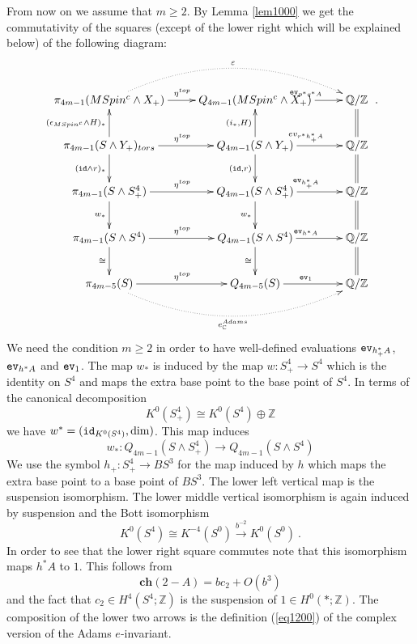 \documentclass[12pt]{article}
\newcommand{\ev}{{\tt ev}}
\newcommand{\id}{{\tt id}}
\newcommand{\Z}{{\mathbb{Z}}}
\newcommand{\Q}{{\mathbb{Q}}}
\newcommand{\C}{{\mathbb{C}}}
\newcommand{\ch}{{\mathbf{ch}}}
\begin{document}
From now on we assume that $m\ge 2$.
By Lemma \ref{lem1000}  we get the commutativity of the  squares (except of the lower right which will be explained below) of  the following  diagram:
\begin{equation}\label{cg100}
\xymatrix{\pi_{4m-1}(MSpin^{c}\wedge X_{+})\ar@/^1cm/@{.>}[rr]^{\varepsilon}\ar[r]^{\eta^{top}}&Q_{4m-1}(MSpin^{c}\wedge  X_{+})\ar[r]^{\ev_{p^{*}q^{*}A}}&\Q/\Z\\
\pi_{4m-1}(S\wedge Y_{+})_{tors}\ar[d]_{(\id\wedge r)_{*}}\ar[u]^{(\epsilon_{MSpin^{c}}\wedge H)_{*}}\ar[r]^{\eta^{top}}&Q_{4m-1}(S\wedge Y_{+})\ar[d]_{(\id, r)}\ar[u]^{(i_{*},H)}\ar[r]^{ev_{r^{*}h_{+}^{*}A}}&\Q/\Z\ar@{=}[u]\\
\pi_{4m-1}(S\wedge S^{4}_{+})\ar[d]_{w_{*}}\ar[r]^{\eta^{top}}&Q_{4m-1}(S\wedge S^{4}_{+})\ar[d]_{w_{*}}\ar[r]^{\ev_{h_{+}^{*}A}}&\Q/\Z\ar@{=}[u]\\
\pi_{4m-1}(S\wedge S^{4})\ar[d]_{\cong}\ar[r]^{\eta^{top}}&Q_{4m-1}( S\wedge S^{4})\ar[d]_{\cong}\ar[r]^{\ev_{h^{*}A}}&\Q/\Z\ar@{=}[u]\\
\pi_{4m-5}(S)\ar@/_1cm/@{.>}[rr]_{e^{Adams}_{\C}}\ar[r]^{\eta^{top}}&Q_{4m-5}(S)\ar[r]^{\ev_{1}}&\Q/\Z\ar@{=}[u]}\ .
\end{equation}
We need the condition $m\ge 2$ in order to have well-defined evaluations $\ev_{h_{+}^{*}A}$, $\ev_{h^{*}A}$ and $\ev_{1}$.
The map $w_{*}$ is induced by the map $w:S^{4}_{+}\to S^{4}$ which is the identity on $S^{4}$ and maps the extra base point to the base point of $S^{4}$. In terms of the canonical decomposition
$$K^{0}(S^{4}_{+})\cong  K^{0}(S^{4})\oplus \Z$$ we have $w^{*}=(\id_{K^{0}(S^{4})},\dim)$.
 This map induces 
$$w_{*}:Q_{4m-1}(S\wedge S^{4}_{+})\to Q_{4m-1}(S\wedge S^{4})$$
   We use the symbol $h_{+}:S^{4}_{+}\to BS^{3}$ for the map induced by $h$ which maps the extra  base point to a base point of $BS^{3}$. 
The lower left vertical map is the suspension isomorphism. The lower middle
vertical isomorphism is again induced by suspension and the Bott isomorphism
$$K^{0}(S^{4})\cong K^{-4}(S^{0})\stackrel{b^{-2}}{\to} K^{0}(S^{0})\ .$$
In order to see that the lower right square commutes note that this isomorphism maps
$h^{*}A$ to $1$. This follows from
$$\ch(2-A)=bc_{2}+O(b^{3})$$
and the fact that $c_{2}\in H^{4}(S^{4};\Z)$ is the suspension of $1\in H^{0}(*;\Z)$.  
The composition of the lower two arrows is the definition (\ref{eq1200}) of the complex version of the Adams $e$-invariant.
\end{document}
